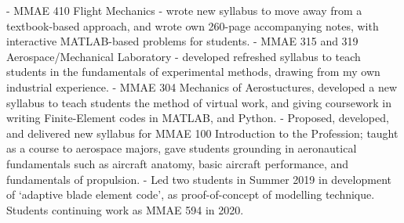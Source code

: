 - MMAE 410 Flight Mechanics - wrote new syllabus to move away from a textbook-based approach, and wrote own 260-page accompanying notes, with interactive MATLAB-based problems for students.
- MMAE 315 and 319 Aerospace/Mechanical Laboratory - developed refreshed syllabus to teach students in the fundamentals of experimental methods, drawing from my own industrial experience.
- MMAE 304 Mechanics of Aerostuctures, developed a new syllabus to teach students the method of virtual work, and giving coursework in writing Finite-Element codes in MATLAB, and Python.
- Proposed, developed, and delivered new syllabus for MMAE 100 Introduction to the Profession; taught as a course to aerospace majors, gave students grounding in aeronautical fundamentals such as aircraft anatomy, basic aircraft performance, and fundamentals of propulsion. 
- Led two students in Summer 2019 in development of `adaptive blade element code', as proof-of-concept of modelling technique. Students continuing work as MMAE 594 in 2020.
